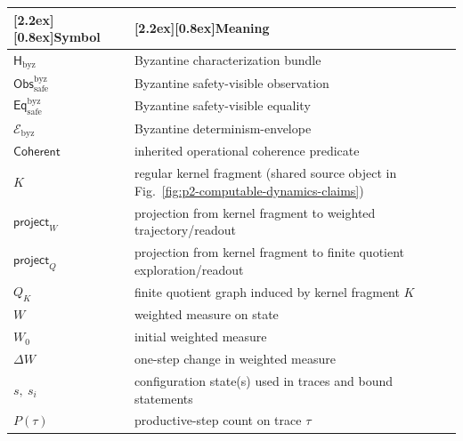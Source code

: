 \documentclass[a4paper,10pt,twocolumn,english]{article}
\numberwithin{equation}{section}
\theoremstyle{paperdef}
\theoremstyle{paperplain}
\theoremstyle{paperdef}
\theoremstyle{paperremark}
\newcommand{\thead}[1]{\textbf{\raisebox{0pt}[2.2ex][0.8ex]{#1}}}
\newcommand{\Hbyz}{\ensuremath{\mathsf{H}_{\mathrm{byz}}}}
\newcommand{\Obssafe}{\ensuremath{\mathsf{Obs}_{\mathrm{safe}}^{\mathrm{byz}}}}
\newcommand{\Eqsafe}{\ensuremath{\mathsf{Eq}_{\mathrm{safe}}^{\mathrm{byz}}}}
\newcommand{\Ebyz}{\ensuremath{\mathcal{E}_{\mathrm{byz}}}}
\newcommand{\Coherent}{\ensuremath{\mathsf{Coherent}}}
\begin{document}
\begin{table}[H]
	\centering
	\small
	\begin{tabularx}{\columnwidth}{@{}L{0.33\columnwidth}L{0.62\columnwidth}@{}}
		\toprule
		\thead{Symbol}       & \thead{Meaning}                                                                                \\
		\midrule
		\Hbyz                & Byzantine characterization bundle                                                              \\
		\Obssafe             & Byzantine safety-visible observation                                                           \\
		\Eqsafe              & Byzantine safety-visible equality                                                              \\
		\Ebyz                & Byzantine determinism-envelope                                                                 \\
		\Coherent            & inherited operational coherence predicate                                                      \\
		$K$                  & regular kernel fragment (shared source object in Fig.~\ref{fig:p2-computable-dynamics-claims}) \\
		$\mathsf{project}_W$ & projection from kernel fragment to weighted trajectory/readout                                 \\
		$\mathsf{project}_Q$ & projection from kernel fragment to finite quotient exploration/readout                         \\
		$Q_K$                & finite quotient graph induced by kernel fragment $K$                                           \\
		$W$                  & weighted measure on state                                                                      \\
		$W_0$                & initial weighted measure                                                                       \\
		$\Delta W$           & one-step change in weighted measure                                                            \\
		$s,\ s_i$            & configuration state(s) used in traces and bound statements                                     \\
		$P(\tau)$            & productive-step count on trace $\tau$                                                          \\

\end{tabularx}
\end{table}
\end{document}
